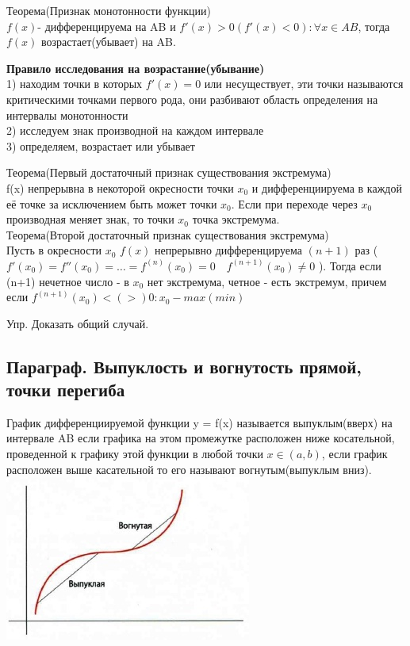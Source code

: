 \documentclass[a4paper, 12pt]{article}
\begin{document}
\begin{mdframed}[backgroundcolor=blue!20] 
       Теорема(Признак монотонности функции)\\
       $ f(x) $- дифференцируема на AB и $ f'(x) > 0(f'(x) < 0):\forall x \in AB $, тогда $ f(x) $ возрастает(убывает) на AB.\\  
    \end{mdframed}
    
\textbf{Правило исследования на возрастание(убывание)}\\
1) находим точки в которых $ f'(x) = 0 $  или несуществует, эти точки называются критическими точками первого рода, они разбивают область определения  на интервалы монотонности\\
2) исследуем знак производной на каждом интервале\\
3) определяем, возрастает или убывает\\

\begin{mdframed}[backgroundcolor=blue!20] 
       
       Теорема(Первый достаточный признак существования экстремума)\\
       f(x) непрерывна в некоторой окресности точки $ x_0 $ и дифференциируема в каждой её точке за исключением быть может точки $ x_0 $. Если при переходе через $ x_0 $ производная меняет знак, то точки $ x_0 $ точка экстремума.\\ 

       Теорема(Второй достаточный признак существования экстремума)\\
       Пусть в окресности $ x_0 $ $ f(x) $ непрерывно дифференцируема $ (n+1) $ раз ($ f'(x_0)= f''(x_0)=\ldots =f^{(n)}(x_0)= 0 \quad f^{(n+1)}(x_0) \neq 0 $ ). Тогда если (n+1) нечетное число - в $ x_0 $ нет экстремума, четное - есть экстремум, причем если $ f^{(n+1)}(x_0) <(>) 0: x_0 - max(min)$     
    \end{mdframed}

Упр. Доказать общий случай.

\subsection{Параграф. Выпуклость и вогнутость прямой, точки перегиба}
График дифференциируемой функции y = f(x) называется выпуклым(вверх) на интервале AB если графика на этом промежутке расположен ниже косательной, проведенной к графику этой функции в любой точки $ x \in (a,b) $, если график расположен выше касательной то его называют вогнутым(выпуклым вниз).\\
\includegraphics{img/101.jpg}\\
\end{document}
